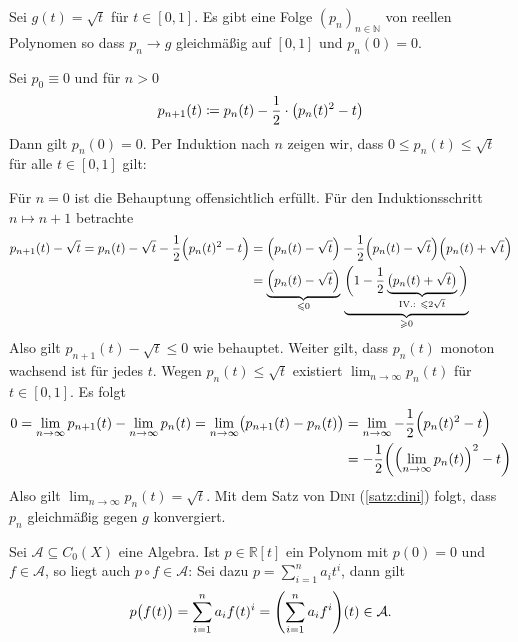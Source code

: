 \begin{lemma}[{name=[Approximation der Wurzelfunktion]},label=lem:wurzel-approx]
	Sei $g(t) = \sqrt{t}$ für $t \in [0,1]$. 
	Es gibt eine Folge $(p_n)_{n \in \mathbb{N}}$ von reellen Polynomen so dass $p_n \to g$ gleichmäßig auf $[0,1]$ und $p_n(0)=0$.
\end{lemma}
\begin{beweis}
	Sei $p_0 \equiv 0$ und für $n > 0$
	\[
		p_{n+1} (t) \coloneqq p_n(t) - \frac{1}{2} \cdot \enbrace[\big]{p_n(t)^2 - t} 
	\]
	Dann gilt $p_n(0)=0$. Per Induktion nach $n$ zeigen wir, dass $0 \le p_n(t) \le \sqrt{t}$ für alle $t \in [0,1]$ gilt:
	
	Für $n=0$ ist die Behauptung offensichtlich erfüllt.
	Für den Induktionsschritt $n \mapsto n+1$ betrachte
	\begin{align*}
		p_{n+1}(t) - \sqrt{t} = p_n(t) - \sqrt{t} - \frac{1}{2} \enbrace[\Big]{p_n(t)^2 -t} &= \enbrace*{p_n(t) - \sqrt{t} }- \frac{1}{2} \enbrace*{p_n(t)- \sqrt{t}} \enbrace*{p_n(t) + \sqrt{t}} \\
		&=\underbrace{\enbrace*{p_n(t) - \sqrt{t}  } }_{\le 0} \, \underbrace{\bigg( 1- \frac{1}{2}\underbrace{\enbrace[\big]{p_n(t) + \sqrt{t}  }}_{\text{IV.: }\le 2 \sqrt{t}} \bigg)
		}_{\ge 0} 
	\end{align*}
	Also gilt $p_{n+1}(t)- \sqrt{t} \le 0$ wie behauptet. 
	Weiter gilt, dass $p_n(t)$ monoton wachsend ist für jedes $t$. 
	Wegen $p_n(t) \le \sqrt{t}$ existiert $\lim_{ n \to \infty} p_n(t)$
	für $t \in [0,1]$. Es folgt 
	\begin{align*}
		0 = \lim_{ n \to \infty} p_{n+1}(t) - \lim_{ n \to \infty} p_n(t) = \lim_{ n \to \infty} \enbrace[\big]{p_{n+1}(t) - p_n(t)} &= \lim_{ n \to \infty} 
		-\frac{1}{2} \enbrace[\Big]{p_n(t)^2 -t  } \\
		&= - \frac{1}{2} \enbrace*{ \enbrace*{\lim_{ n \to \infty} p_n(t)}^2 -t }  
	\end{align*}
	Also gilt $\lim_{ n \to \infty} p_n(t) = \sqrt{t}$. 
	Mit dem Satz von \textsc{Dini} (\ref{satz:dini}) folgt, dass $p_n$ gleichmäßig gegen $g$ konvergiert.
\end{beweis}

\begin{bemerkung}[{name=[Komposition von Elementen einer Unteralgebra mit Polynomen]},label=bem:komp-polynome]
	Sei $\mathcal{A} \subseteq C_0(X)$ eine Algebra. 
	Ist $p \in \mathbb{R}[t]$ ein Polynom mit $p(0)=0$ und $f \in \mathcal{A}$, so liegt auch $p \circ f \in \mathcal{A}$:
	Sei dazu $p= \sum_{i=1}^{n} a_i t^i$, dann gilt 
	\[
		p\enbrace[\big]{f(t)} = \sum_{i=1}^{n} a_i f(t)^i = \enbrace*{\sum_{i=1}^{n} a_i f^i} (t) \in \mathcal{A}. 
	\]
\end{bemerkung}


